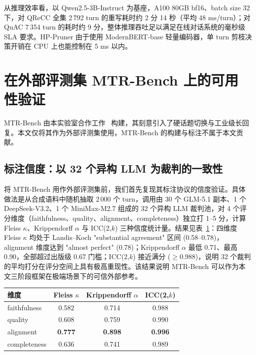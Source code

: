 从推理效率看，以 Qwen2.5-3B-Instruct 为基座，A100 80GB bf16、batch size 32 下，对 QReCC 全集 2\,792 turn 的重写耗时约 2 分 14 秒（平均 48 ms/turn）；对 QuAC 7\,354 turn 的耗时约 9 分，整体推理吞吐足以满足在线对话系统的毫秒级 SLA 要求。HP-Pruner 由于使用 ModernBERT-base 轻量编码器，单 turn 剪枝决策开销在 CPU 上也能控制在 5 ms 以内。

\section{在外部评测集 MTR-Bench 上的可用性验证}
\label{sec:exp_mtrbench}

MTR-Bench 由本实验室合作工作~\citep{mtrsuite2025} 构建，其刻意引入了硬话题切换与工业级长回复。本文仅将其作为外部评测集使用，MTR-Bench 的构建与标注不属于本文贡献。

\subsection{标注信度：以 32 个异构 LLM 为裁判的一致性}

将 MTR-Bench 用作外部评测集前，我们首先复现其标注协议的信度验证。具体做法是从合成语料中随机抽取 2\,000 个 turn，调用由 30 个 GLM-5.1 副本、1 个 DeepSeek-V3.2、1 个 MiniMax-M2.7 组成的 32 个异构 LLM 裁判池，对 4 个评分维度（faithfulness、quality、alignment、completeness）独立打 1--5 分，计算 Fleiss $\kappa$、Krippendorff $\alpha$ 与 ICC(2,$k$) 三种信度统计量。结果见表~\ref{tab:mtr_agreement}：四维度 Fleiss $\kappa$ 均处于 Landis--Koch "substantial agreement" 区间 (0.58--0.78)，alignment 维度达到 "almost perfect" (0.78)；Krippendorff $\alpha$ 最低 0.71、最高 0.90，全部超过出版级 0.67 门槛；ICC(2,$k$) 接近满分 ($\ge 0.988$)，说明 32 个裁判的平均打分在评分空间上具有极高重现性。该结果说明 MTR-Bench 可以作为本文三阶段框架在极端场景下的可信外部参考。

\begin{table}[h]
\centering
{}
\label{tab:mtr_agreement}
\begin{tabular}{lccc}
\toprule
维度 & Fleiss $\kappa$ & Krippendorff $\alpha$ & ICC(2,$k$) \\
\midrule
faithfulness  & 0.582 & 0.714 & 0.988 \\
quality       & 0.608 & 0.759 & 0.990 \\
alignment     & \textbf{0.777} & \textbf{0.898} & \textbf{0.996} \\
completeness  & 0.636 & 0.741 & 0.989 \\
\bottomrule
\end{tabular}
\end{table}

